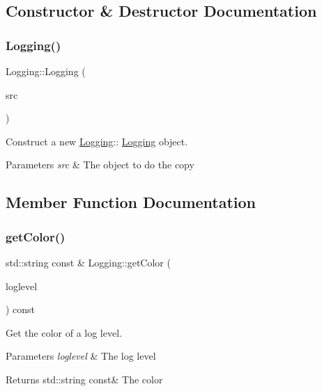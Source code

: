 \subsection{Constructor \& Destructor Documentation}
\mbox{\label{class_logging_a4edcd4fdedc39eaff3bdb62e2d485f8f}} 
\subsubsection{\texorpdfstring{Logging()}{Logging()}}
{\footnotesize\ttfamily Logging\+::\+Logging (\begin{DoxyParamCaption}\item[{\hyperlink{class_logging}{Logging} const \&}]{src }\end{DoxyParamCaption})}



Construct a new \hyperlink{class_logging}{Logging}\+:\+: \hyperlink{class_logging}{Logging} object. 


\begin{DoxyParams}{Parameters}
{\em src} & The object to do the copy \\
\hline
\end{DoxyParams}


\subsection{Member Function Documentation}
\mbox{\label{class_logging_ab6b777cad3125e46c087e439e8d42e04}} 
\subsubsection{\texorpdfstring{get\+Color()}{getColor()}}
{\footnotesize\ttfamily std\+::string const  \& Logging\+::get\+Color (\begin{DoxyParamCaption}\item[{e\+Loglevel}]{loglevel }\end{DoxyParamCaption}) const}



Get the color of a log level. 


\begin{DoxyParams}{Parameters}
{\em loglevel} & The log level \\
\hline
\end{DoxyParams}
\begin{DoxyReturn}{Returns}
std\+::string const\& The color 
\end{DoxyReturn}
\mbox{\label{class_logging_a79047102294c8446fb8ec27e95835e52}} 
